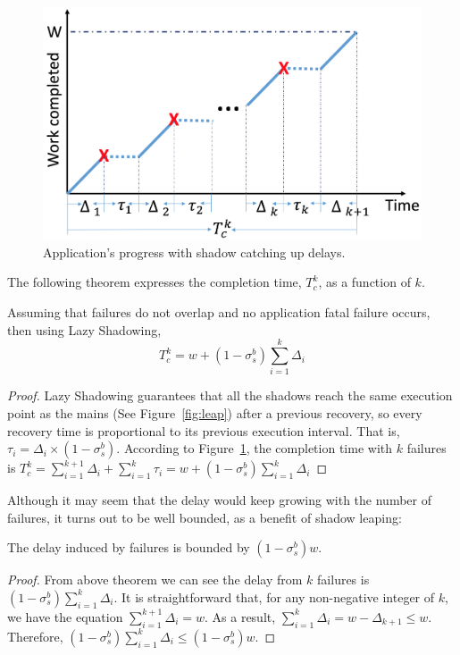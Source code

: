 \begin{figure}[!t]
	\begin{center}
		\includegraphics[width=0.7\columnwidth]{figures/progress}
	\end{center}
	\caption{Application's progress with shadow catching up delays.}
	\label{fig:progress}
\end{figure}


The following theorem expresses the completion time, $T_c^k$, as a function of $k$.

\begin{theorem}
Assuming that failures do not overlap and no application fatal failure occurs, then using Lazy Shadowing, 
	$$T_c^k = w + (1-\sigma_s^b)\sum_{i=1}^k\Delta_i$$
\end{theorem}
\begin{proof}

Lazy Shadowing guarantees that all the shadows reach the same execution point as the mains (See Figure~\ref{fig:leap}) after a previous recovery, so every recovery time is proportional to its previous execution interval. %
That is, $\tau_i = \Delta_i \times (1 - \sigma_s^b)$. 
According to Figure~\ref{fig:progress}, the completion time with $k$ failures is 
	$T_c^k = \sum_{i=1}^{k+1}\Delta_i + \sum_{i=1}^k\tau_i = w + (1-\sigma_s^b)\sum_{i=1}^k\Delta_i$
\end{proof}

Although it may seem that the delay would keep growing with the number of failures, 
it turns out to be well bounded, as a benefit of shadow leaping: 

\begin{corollary}
The delay induced by failures is bounded by $(1-\sigma_s^b)w$.
\end{corollary}
\begin{proof}
From above theorem we can see the delay from $k$ failures is $(1-\sigma_s^b)\sum_{i=1}^k\Delta_i$. It is straightforward that, for any non-negative integer of $k$, we have the equation $\sum_{i=1}^{k+1}\Delta_i= w$. As a result, 
$\sum_{i=1}^{k}\Delta_i = w - \Delta_{k+1} \le w$. Therefore, $(1-\sigma_s^b)\sum_{i=1}^k\Delta_i \le (1-\sigma_s^b)w$.
\end{proof}

